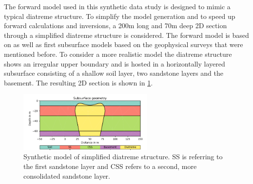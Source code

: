 The forward model used in this synthetic data study is designed to mimic a typical diatreme structure. To simplify the model generation and to speed up forward calculations and inversions, a 200m long and 70m deep 2D section through a simplified diatreme structure is considered. The forward model is based on \citet{white2011maar} as well as first subsurface models based on the geophysical surveys that were mentioned before. To consider a more realistic model the diatreme structure shows an irregular upper boundary and is hosted in a horizontally layered subsurface consisting of a shallow soil layer, two sandstone layers and the basement. The resulting 2D section is shown in \ref{figure:synthetic_model}.

\begin{figure}[H]
  \centering
    \includegraphics[width=0.6\textwidth]{Figures/Model.png}
    \caption[Synthetic model of simplified diatreme structure]{Synthetic model of simplified diatreme structure. SS is referring to the first sandstone layer and CSS refers to a second, more consolidated sandstone layer.}
    \label{figure:synthetic_model}
\end{figure}
